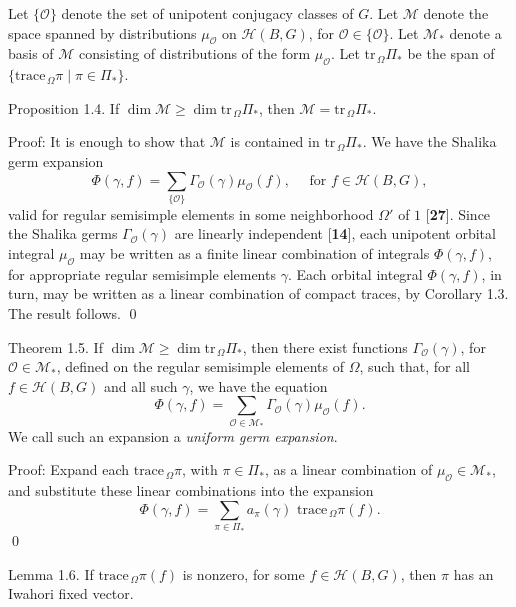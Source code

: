 \documentclass{amsart}
\begin{document}
Let 
  $ \{ \mathcal O \} $
denote the set of unipotent conjugacy classes of $G$.
Let 
  $ \mathcal M $
denote the space spanned by distributions
  $ \mu_{\mathcal O} $ 
on
  $ {\mathcal H} (B,G) $,
  for
  $ \mathcal O \in \{ \mathcal O \} $.
Let 
  $ {\mathcal M}_* $
denote a basis of
  ${\mathcal M}$
consisting of distributions of the form
  $ \mu_{\mathcal O} $.
Let
  $\text{tr}_{\,\Omega}\Pi_*$
be the span of 
  $ \{ \text{trace}_{\,\Omega} \pi \mid \pi
     \in \Pi_* \} $.

\proclaim Proposition {1.4}.
If 
  $ \dim {\mathcal M} \geq \dim \text{tr}_{\,\Omega}\Pi_*$,
then
  $ {\mathcal M} = \text{tr}_{\,\Omega}\Pi_*$.
\finishproclaim

\pproclaim Proof:
It is enough to show that ${\mathcal M}$ is contained in $\text{tr}_{\,\Omega}\Pi_*$.
We have the Shalika germ expansion
$$\Phi(\gamma,f) = \sum_{\{{\mathcal O}\}}\Gamma_{\mathcal O}(\gamma)\mu_{\mathcal O}(f),
	\quad \text { for } f\in {\mathcal H}(B,G),$$
valid for regular semisimple elements in some neighborhood 
$\Omega'$ of $1$ [{\bf 27}].   Since the Shalika germs
$\Gamma_{\mathcal O}(\gamma)$ are linearly independent [{\bf 14}],
each unipotent orbital integral $\mu_{\mathcal O}$ may be written
as a finite linear combination of integrals $\Phi(\gamma,f)$,
for appropriate regular semisimple elements $\gamma$.  Each
orbital integral $\Phi(\gamma,f)$, in turn, may be written
as a linear combination of compact traces, by Corollary 1.3.
The result follows.
\qed
\finishpproclaim

\proclaim Theorem {1.5}.
If 
   $ \dim {\mathcal M} \geq \dim \text{tr}_{\,\Omega}\Pi_*$,
then there exist functions
  $ \Gamma_{\mathcal O} (\gamma) $, for ${\mathcal O}\in{\mathcal M}_*$,  defined on the
  regular semisimple elements of
  $ \Omega $,
such that, for all
  $ f \in {\mathcal H} (B,G) $
and all such 
  $ \gamma  $, we have the equation
%
$$
  \Phi (\gamma,f) =
  \sum_{{\mathcal O}\in{\mathcal M}_*}
  \Gamma_{\mathcal O}
  (\gamma) \mu_{\mathcal O} (f).
$$
%
\finishproclaim
\noindent
We call such an expansion a {\it uniform germ expansion}.

\pproclaim Proof:
Expand each
  $ \text{trace}_{\,\Omega}\pi $, with  
  $ \pi \in \Pi_* $,
as a linear combination of
  $ \mu_{\mathcal O} \in {\mathcal M}_* $,
and substitute these linear combinations into the expansion
%
$$
  \Phi(\gamma,f) =
  \sum_{\pi\in\Pi_*}
  a_{\pi}(\gamma) \,\, \text{trace}_{\,\Omega} \pi(f).
$$
%
\qed
\finishpproclaim

\proclaim Lemma {1.6}.
If
  $ \text{trace}_{\,\Omega}\pi (f) $ is nonzero, 
for some 
  $ f \in \mathcal H (B, G) $,
then
  $ \pi $
has an Iwahori fixed vector.
\finishproclaim
\end{document}
